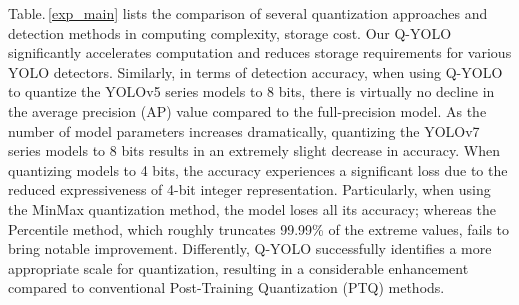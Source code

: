 \documentclass[runningheads]{llncs}
\begin{document}
Table.\,\ref{exp_main} lists the comparison of several quantization approaches and detection methods in computing complexity, storage cost. Our Q-YOLO significantly accelerates computation and reduces storage requirements for various YOLO detectors. Similarly, in terms of detection accuracy, when using Q-YOLO to quantize the YOLOv5 series models to 8 bits, there is virtually no decline in the average precision (AP) value compared to the full-precision model. As the number of model parameters increases dramatically, quantizing the YOLOv7 series models to 8 bits results in an extremely slight decrease in accuracy. When quantizing models to 4 bits, the accuracy experiences a significant loss due to the reduced expressiveness of 4-bit integer representation. Particularly, when using the MinMax quantization method, the model loses all its accuracy; whereas the Percentile method, which roughly truncates 99.99\% of the extreme values, fails to bring notable improvement. Differently, Q-YOLO successfully identifies a more appropriate scale for quantization, resulting in a considerable enhancement compared to conventional Post-Training Quantization (PTQ) methods.
\end{document}
